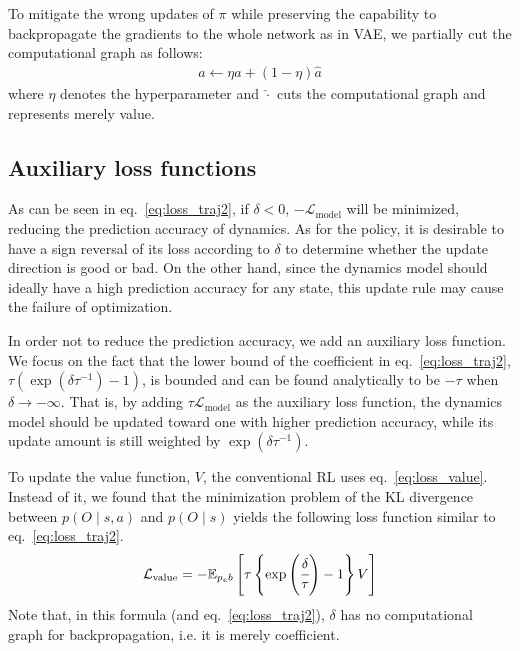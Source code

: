 \documentclass{bmcart}
\begin{document}
To mitigate the wrong updates of $\pi$ while preserving the capability to backpropagate the gradients to the whole network as in VAE, we partially cut the computational graph as follows:
\begin{align}
    a \gets \eta a + (1 - \eta) \hat{a}
    \label{eq:action_graph_cut}
\end{align}
where $\eta$ denotes the hyperparameter and $\hat{\cdot}$ cuts the computational graph and represents merely value.

\subsection{Auxiliary loss functions}

As can be seen in eq.~\eqref{eq:loss_traj2}, if $\delta < 0$, $- \mathcal{L}_\mathrm{model}$ will be minimized, reducing the prediction accuracy of dynamics.
As for the policy, it is desirable to have a sign reversal of its loss according to $\delta$ to determine whether the update direction is good or bad.
On the other hand, since the dynamics model should ideally have a high prediction accuracy for any state, this update rule may cause the failure of optimization.

In order not to reduce the prediction accuracy, we add an auxiliary loss function.
We focus on the fact that the lower bound of the coefficient in eq.~\eqref{eq:loss_traj2}, $\tau (\exp(\delta\tau^{-1}) - 1)$, is bounded and can be found analytically to be $-\tau$ when $\delta \to - \infty$.
That is, by adding $\tau \mathcal{L}_\mathrm{model}$ as the auxiliary loss function, the dynamics model should be updated toward one with higher prediction accuracy, while its update amount is still weighted by $\exp(\delta\tau^{-1})$.

To update the value function, $V$, the conventional RL uses eq.~\eqref{eq:loss_value}.
Instead of it, we found that the minimization problem of the KL divergence between $p(O \mid s, a)$ and $p(O \mid s)$ yields the following loss function similar to eq.~\eqref{eq:loss_traj2}.
\begin{align}
    \mathcal{L}_\mathrm{value} = - \mathbb{E}_{p_e b}\left [ \tau \left \{\exp\left( \cfrac{\delta}{\tau} \right) - 1 \right \} V \right ]
    \label{eq:loss_value2}
\end{align}
Note that, in this formula (and eq.~\eqref{eq:loss_traj2}), $\delta$ has no computational graph for backpropagation, i.e. it is merely coefficient.
\end{document}
